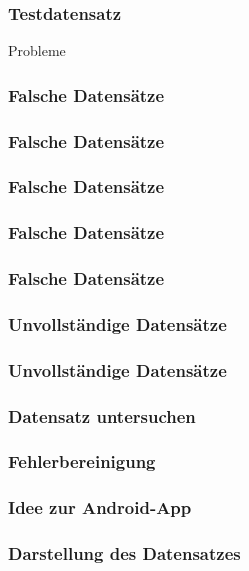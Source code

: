
\begin{frame}
    \frametitle{Testdatensatz}
    \begin{center}
    \huge{Probleme}
    \end{center}
\end{frame}

\begin{frame}
  \frametitle{Falsche Datensätze}
\end{frame}

\begin{frame}
  \frametitle{Falsche Datensätze}
\end{frame}

\begin{frame}
  \frametitle{Falsche Datensätze}
\end{frame}

\begin{frame}
  \frametitle{Falsche Datensätze}
\end{frame}

\begin{frame}
  \frametitle{Falsche Datensätze}
  \Wider{\texttt{[image: 0040]}}
\end{frame}


\begin{frame}
  \frametitle{Unvollständige Datensätze}
\end{frame}

\begin{frame}
  \frametitle{Unvollständige Datensätze}
\end{frame}



\begin{frame}
    \frametitle{Datensatz untersuchen}
\end{frame}

\begin{frame}
    \frametitle{Fehlerbereinigung}
\end{frame}

\begin{frame}
    \frametitle{Idee zur Android-App}
\end{frame}

\begin{frame}
    \frametitle{Darstellung des Datensatzes}
\end{frame}
